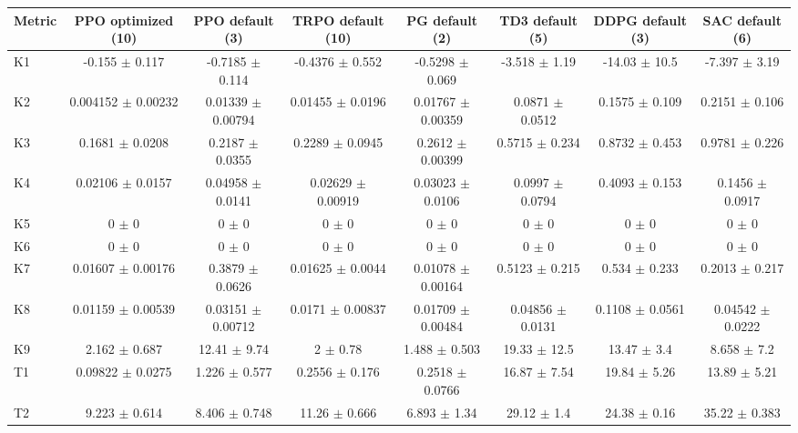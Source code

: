 \begin{tabular}{lccccccc}
\toprule
Metric & PPO optimized (10) & PPO default (3) & TRPO default (10) & PG default (2) & TD3 default (5) & DDPG default (3) & SAC default (6) \\
\midrule
K1 & -0.155 $\pm$ 0.117 & -0.7185 $\pm$ 0.114 & -0.4376 $\pm$ 0.552 & -0.5298 $\pm$ 0.069 & -3.518 $\pm$ 1.19 & -14.03 $\pm$ 10.5 & -7.397 $\pm$ 3.19 \\
K2 & 0.004152 $\pm$ 0.00232 & 0.01339 $\pm$ 0.00794 & 0.01455 $\pm$ 0.0196 & 0.01767 $\pm$ 0.00359 & 0.0871 $\pm$ 0.0512 & 0.1575 $\pm$ 0.109 & 0.2151 $\pm$ 0.106 \\
K3 & 0.1681 $\pm$ 0.0208 & 0.2187 $\pm$ 0.0355 & 0.2289 $\pm$ 0.0945 & 0.2612 $\pm$ 0.00399 & 0.5715 $\pm$ 0.234 & 0.8732 $\pm$ 0.453 & 0.9781 $\pm$ 0.226 \\
K4 & 0.02106 $\pm$ 0.0157 & 0.04958 $\pm$ 0.0141 & 0.02629 $\pm$ 0.00919 & 0.03023 $\pm$ 0.0106 & 0.0997 $\pm$ 0.0794 & 0.4093 $\pm$ 0.153 & 0.1456 $\pm$ 0.0917 \\
K5 & 0 $\pm$ 0 & 0 $\pm$ 0 & 0 $\pm$ 0 & 0 $\pm$ 0 & 0 $\pm$ 0 & 0 $\pm$ 0 & 0 $\pm$ 0 \\
K6 & 0 $\pm$ 0 & 0 $\pm$ 0 & 0 $\pm$ 0 & 0 $\pm$ 0 & 0 $\pm$ 0 & 0 $\pm$ 0 & 0 $\pm$ 0 \\
K7 & 0.01607 $\pm$ 0.00176 & 0.3879 $\pm$ 0.0626 & 0.01625 $\pm$ 0.0044 & 0.01078 $\pm$ 0.00164 & 0.5123 $\pm$ 0.215 & 0.534 $\pm$ 0.233 & 0.2013 $\pm$ 0.217 \\
K8 & 0.01159 $\pm$ 0.00539 & 0.03151 $\pm$ 0.00712 & 0.0171 $\pm$ 0.00837 & 0.01709 $\pm$ 0.00484 & 0.04856 $\pm$ 0.0131 & 0.1108 $\pm$ 0.0561 & 0.04542 $\pm$ 0.0222 \\
K9 & 2.162 $\pm$ 0.687 & 12.41 $\pm$ 9.74 & 2 $\pm$ 0.78 & 1.488 $\pm$ 0.503 & 19.33 $\pm$ 12.5 & 13.47 $\pm$ 3.4 & 8.658 $\pm$ 7.2 \\
T1 & 0.09822 $\pm$ 0.0275 & 1.226 $\pm$ 0.577 & 0.2556 $\pm$ 0.176 & 0.2518 $\pm$ 0.0766 & 16.87 $\pm$ 7.54 & 19.84 $\pm$ 5.26 & 13.89 $\pm$ 5.21 \\
T2 & 9.223 $\pm$ 0.614 & 8.406 $\pm$ 0.748 & 11.26 $\pm$ 0.666 & 6.893 $\pm$ 1.34 & 29.12 $\pm$ 1.4 & 24.38 $\pm$ 0.16 & 35.22 $\pm$ 0.383 \\
\bottomrule
\end{tabular}
